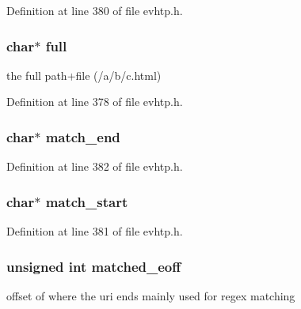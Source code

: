 \-Definition at line 380 of file evhtp.\-h.

\hypertarget{structevhtp__path__s_a3deff62337b4ec745307f4410d7ff6ce}{
\subsubsection[{full}]{\setlength{\rightskip}{0pt plus 5cm}char$\ast$ {\bf full}}}\label{structevhtp__path__s_a3deff62337b4ec745307f4410d7ff6ce}
the full path+file (/a/b/c.html) 

\-Definition at line 378 of file evhtp.\-h.

\hypertarget{structevhtp__path__s_aa1f13c993b57860b101d02bc62bb801b}{
\subsubsection[{match\-\_\-end}]{\setlength{\rightskip}{0pt plus 5cm}char$\ast$ {\bf match\-\_\-end}}}\label{structevhtp__path__s_aa1f13c993b57860b101d02bc62bb801b}


\-Definition at line 382 of file evhtp.\-h.

\hypertarget{structevhtp__path__s_a25d9dc60fbb26e1c4898184e1e46e9ab}{
\subsubsection[{match\-\_\-start}]{\setlength{\rightskip}{0pt plus 5cm}char$\ast$ {\bf match\-\_\-start}}}\label{structevhtp__path__s_a25d9dc60fbb26e1c4898184e1e46e9ab}


\-Definition at line 381 of file evhtp.\-h.

\hypertarget{structevhtp__path__s_ae9fc73e1697747df74873f20d91db690}{
\subsubsection[{matched\-\_\-eoff}]{\setlength{\rightskip}{0pt plus 5cm}unsigned int {\bf matched\-\_\-eoff}}}\label{structevhtp__path__s_ae9fc73e1697747df74873f20d91db690}
offset of where the uri ends mainly used for regex matching 

